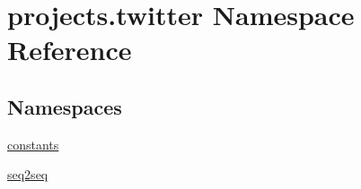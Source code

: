 \hypertarget{namespaceprojects_1_1twitter}{}\section{projects.\+twitter Namespace Reference}
\label{namespaceprojects_1_1twitter}
\subsection*{Namespaces}
\begin{DoxyCompactItemize}
\item 
 \hyperlink{namespaceprojects_1_1twitter_1_1constants}{constants}
\item 
 \hyperlink{namespaceprojects_1_1twitter_1_1seq2seq}{seq2seq}
\end{DoxyCompactItemize}

